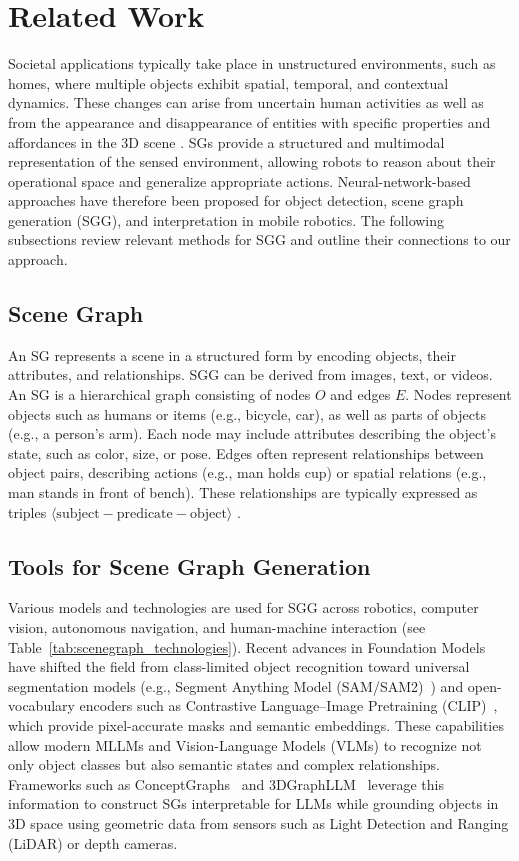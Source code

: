 \documentclass[lettersize,journal]{IEEEtran}
\begin{document}
\section{Related Work}\label{relatedwork}
Societal applications typically take place in unstructured environments, such as homes, where multiple objects exhibit spatial, temporal, and contextual dynamics. These changes can arise from uncertain human activities as well as from the appearance and disappearance of entities with specific properties and affordances in the 3D scene \cite{yalcinkaya2024towards}. SGs provide a structured and multimodal representation of the sensed environment, allowing robots to reason about their operational space and generalize appropriate actions. Neural-network-based approaches have therefore been proposed for object detection, scene graph generation (SGG), and interpretation in mobile robotics. The following subsections review relevant methods for SGG and outline their connections to our approach.

\subsection{Scene Graph}\label{scenegraph}

An SG represents a scene in a structured form by encoding objects, their attributes, and relationships. SGG can be derived from images, text, or videos. An SG is a hierarchical graph consisting of nodes $O$ and edges $E$. Nodes represent objects such as humans or items (e.g., bicycle, car), as well as parts of objects (e.g., a person's arm). Each node may include attributes describing the object's state, such as color, size, or pose. Edges often represent relationships between object pairs, describing actions (e.g., man holds cup) or spatial relations (e.g., man stands in front of bench). These relationships are typically expressed as triples 
$\langle \text{subject} - \text{predicate} - \text{object} \rangle$ \cite{li2024scene}.
\subsection{Tools for Scene Graph Generation}
\noindent Various models and technologies are used for SGG across robotics, computer vision, autonomous navigation, and human-machine interaction (see Table~\ref{tab:scenegraph_technologies}). Recent advances in Foundation Models have shifted the field from class-limited object recognition toward universal segmentation models (e.g., Segment Anything Model (SAM/SAM2)~\cite{jiaxing2025sam2}) and open-vocabulary encoders such as Contrastive Language–Image Pretraining (CLIP)~\cite{chen2024clip}, which provide pixel-accurate masks and semantic embeddings. These capabilities allow modern MLLMs and Vision-Language Models (VLMs) to recognize not only object classes but also semantic states and complex relationships. Frameworks such as ConceptGraphs~\cite{gu2024conceptgraphs} and 3DGraphLLM~\cite{zemskova20253dgraphllm} leverage this information to construct SGs interpretable for LLMs while grounding objects in 3D space using geometric data from sensors such as Light Detection and Ranging (LiDAR) or depth cameras. 
\end{document}
